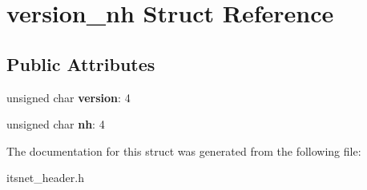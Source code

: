 \hypertarget{structversion__nh}{\section{version\-\_\-nh \-Struct \-Reference}
\label{structversion__nh}
}
\subsection*{\-Public \-Attributes}
\begin{DoxyCompactItemize}
\item 
\hypertarget{structversion__nh_a366c802071040223aefc7bd2ea8f443f}{unsigned char {\bfseries version}\-: 4}\label{structversion__nh_a366c802071040223aefc7bd2ea8f443f}

\item 
\hypertarget{structversion__nh_aa011d58305a9f46223b1fdb8352cd80d}{unsigned char {\bfseries nh}\-: 4}\label{structversion__nh_aa011d58305a9f46223b1fdb8352cd80d}

\end{DoxyCompactItemize}


\-The documentation for this struct was generated from the following file\-:\begin{DoxyCompactItemize}
\item 
itsnet\-\_\-header.\-h\end{DoxyCompactItemize}
